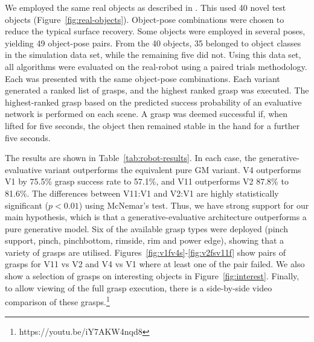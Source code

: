 We employed the same real objects as described in \cite{kopicki2019ijrr}. This used 40 novel test objects (Figure~\ref{fig:real-objects}). Object-pose combinations were chosen to reduce the typical surface recovery. Some objects were employed in several poses, yielding 49 object-pose pairs. From the 40 objects, 35 belonged to object classes in the simulation data set, while the remaining five did not. Using this data set, all algorithms were evaluated on the real-robot using a paired trials methodology. Each was presented with the same object-pose combinations. Each variant generated a ranked list of grasps, and the highest ranked grasp was executed. The highest-ranked grasp based on the predicted success probability of an evaluative network is performed on each scene. A grasp was deemed successful if, when lifted for five seconds, the object then remained stable in the hand for a further five seconds.

The results are shown in Table~\ref{tab:robot-results}. In each case, the generative-evaluative variant outperforms the equivalent pure GM variant. V4 outperforms V1 by 75.5\% grasp success rate to 57.1\%, and V11 outperforms V2 87.8\% to 81.6\%. The differences between V11:V1 and V2:V1 are highly statistically significant ($p<0.01$) using McNemar's test. Thus, we have strong support for our main hypothesis, which is that a generative-evaluative architecture outperforms a pure generative model. Six of the available grasp types were deployed (pinch support, pinch, pinchbottom, rimside, rim and power edge), showing that a variety of grasps are utilised. Figures~\ref{fig:v1fv4s}-\ref{fig:v2fsv11f} show pairs of grasps for V11 vs V2  and V4 vs V1 where at least one of the pair failed. We also show a selection of grasps on interesting objects in Figure~\ref{fig:interest}. Finally, to allow viewing of the full grasp execution, there is a side-by-side video comparison of these grasps.\footnote{https://youtu.be/iY7AKW4nqd8}

